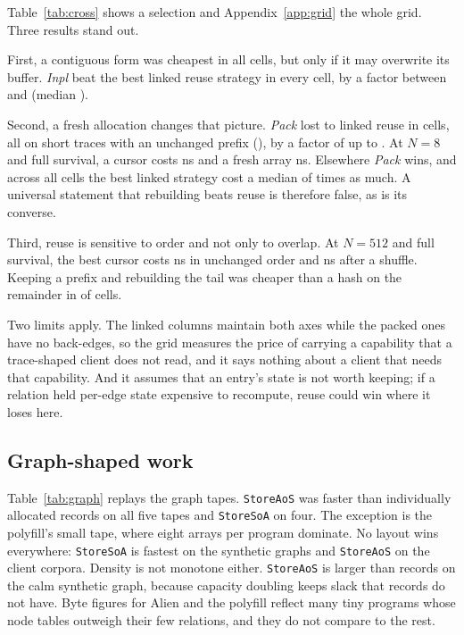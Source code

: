 \documentclass[11pt]{article}
\begin{document}
Table~\ref{tab:cross} shows a selection and Appendix~\ref{app:grid} the whole grid. Three results stand out.

First, a contiguous form was cheapest in all \crossCells{} cells, but only if it may overwrite its buffer. \emph{Inpl} beat the best linked reuse strategy in every cell, by a factor between \crossInplaceRatioMin{} and \crossInplaceRatioMax{} (median \crossInplaceRatioMedian{}).

Second, a fresh allocation changes that picture. \emph{Pack} lost to linked reuse in \crossPackedLosses{} cells, all on short traces with an unchanged prefix (\crossPackedLossCells{}), by a factor of up to \crossMaxLinkedAdvantage{}. At $N=8$ and full survival, a cursor costs \stableEightCursor{} ns and a fresh array \stableEightPacked{} ns. Elsewhere \emph{Pack} wins, and across all cells the best linked strategy cost a median of \crossPackedRatioMedian{} times as much. A universal statement that rebuilding beats reuse is therefore false, as is its converse.

Third, reuse is sensitive to order and not only to overlap. At $N=512$ and full survival, the best cursor costs \noneFiveTwelveCursor{} ns in unchanged order and \chaoticFiveTwelveCursor{} ns after a shuffle. Keeping a prefix and rebuilding the tail was cheaper than a hash on the remainder in \crossTailBeatsCursor{} of \crossCells{} cells.

Two limits apply. The linked columns maintain both axes while the packed ones have no back-edges, so the grid measures the price of carrying a capability that a trace-shaped client does not read, and it says nothing about a client that needs that capability. And it assumes that an entry's state is not worth keeping; if a relation held per-edge state expensive to recompute, reuse could win where it loses here.

\subsection{Graph-shaped work}

Table~\ref{tab:graph} replays the graph tapes. \texttt{StoreAoS} was faster than individually allocated records on all five tapes and \texttt{StoreSoA} on four. The exception is the polyfill's small tape, where eight arrays per program dominate. No layout wins everywhere: \texttt{StoreSoA} is fastest on the synthetic graphs and \texttt{StoreAoS} on the client corpora. Density is not monotone either. \texttt{StoreAoS} is larger than records on the calm synthetic graph, because capacity doubling keeps slack that records do not have. Byte figures for Alien and the polyfill reflect many tiny programs whose node tables outweigh their few relations, and they do not compare to the rest.
\end{document}
